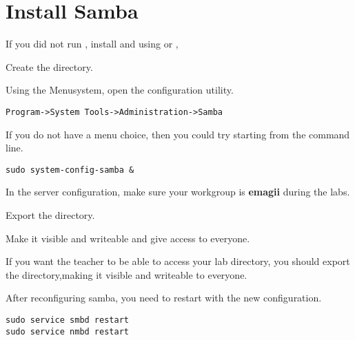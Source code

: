 
\section{Install Samba}

If you did not run , 
install  and 
using  or , 

Create the  directory.

Using the Menusystem, open the  configuration utility.

\begin{verbatim}
Program->System Tools->Administration->Samba
\end{verbatim}

If you do not have a menu choice, then you could try starting from the command line.

\begin{verbatim}
sudo system-config-samba &
\end{verbatim}

In the server configuration, make sure your workgroup is {\bf emagii} during the labs.

Export the  directory.

Make it visible and writeable and give access to everyone.

If you want the teacher to be able to access your lab directory, 
you should export the \labdir directory,making it visible and writeable to everyone.

After reconfiguring samba, you need to restart with the new configuration.

\begin{verbatim}
sudo service smbd restart
sudo service nmbd restart
\end{verbatim}
